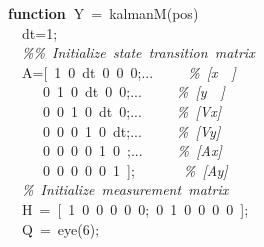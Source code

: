 \documentclass{article}\usepackage{graphicx, color}
\newcommand{\hlstd}[1]{\textcolor[rgb]{0,0,0}{#1}}%
\newcommand{\hlnum}[1]{\textcolor[rgb]{0.16,0.16,1}{#1}}
\newcommand{\hlslc}[1]{\textcolor[rgb]{0.51,0.51,0.51}{\it{#1}}}
\newcommand{\hlkwa}[1]{\textcolor[rgb]{0,0,0}{\bf{#1}}}
\newcommand{\hlopt}[1]{\textcolor[rgb]{0,0,0}{#1}}
\begin{document}
\noindent
\ttfamily
\hlstd{}\hlkwa{function\ }\hlstd{Y\ }\hlopt{=\ }\hlstd{kalmanM}\hlopt{(}\hlstd{pos}\hlopt{)}\hspace*{\fill}\\
\hlstd{}\hlstd{\ \ }\hlstd{dt}\hlopt{=}\hlstd{}\hlnum{1}\hlstd{}\hlopt{;}\hspace*{\fill}\\
\hlstd{}\hlstd{\ \ }\hlstd{}\hlslc{\%\%\ Initialize\ state\ transition\ matrix}\hspace*{\fill}\\
\hlstd{}\hlstd{\ \ }\hlstd{A}\hlopt{={[}\ }\hlstd{}\hlnum{1\ 0\ }\hlstd{dt\ }\hlnum{0\ 0\ 0}\hlstd{}\hlopt{;}\hlstd{...}\hlstd{\ \ \ \ \ }\hlstd{}\hlslc{\%\ {[}x}\hlstd{\ \ }\hlslc{{]}}\hspace*{\fill}\\
\hlstd{}\hlstd{\ \ \ \ \ }\hlstd{}\hlnum{0\ 1\ 0\ }\hlstd{dt\ }\hlnum{0\ 0}\hlstd{}\hlopt{;}\hlstd{...}\hlstd{\ \ \ \ \ }\hlstd{}\hlslc{\%\ {[}y}\hlstd{\ \ }\hlslc{{]}}\hspace*{\fill}\\
\hlstd{}\hlstd{\ \ \ \ \ }\hlstd{}\hlnum{0\ 0\ 1\ 0\ }\hlstd{dt\ }\hlnum{0}\hlstd{}\hlopt{;}\hlstd{...}\hlstd{\ \ \ \ \ }\hlstd{}\hlslc{\%\ {[}Vx{]}}\hspace*{\fill}\\
\hlstd{}\hlstd{\ \ \ \ \ }\hlstd{}\hlnum{0\ 0\ 0\ 1\ 0\ }\hlstd{dt}\hlopt{;}\hlstd{...}\hlstd{\ \ \ \ \ }\hlstd{}\hlslc{\%\ {[}Vy{]}}\hspace*{\fill}\\
\hlstd{}\hlstd{\ \ \ \ \ }\hlstd{}\hlnum{0\ 0\ 0\ 0\ 1\ 0\ }\hlstd{}\hlopt{;}\hlstd{...}\hlstd{\ \ \ \ \ }\hlstd{}\hlslc{\%\ {[}Ax{]}}\hspace*{\fill}\\
\hlstd{}\hlstd{\ \ \ \ \ }\hlstd{}\hlnum{0\ 0\ 0\ 0\ 0\ 1\ }\hlstd{}\hlopt{{]};}\hlstd{\ \ \ \ \ \ \ }\hlopt{}\hlstd{}\hlslc{\%\ {[}Ay{]}}\hspace*{\fill}\\
\hlstd{}\hlstd{\ \ }\hlstd{}\hlslc{\%\ Initialize\ measurement\ matrix}\hspace*{\fill}\\
\hlstd{}\hlstd{\ \ }\hlstd{H\ }\hlopt{=\ {[}\ }\hlstd{}\hlnum{1\ 0\ 0\ 0\ 0\ 0}\hlstd{}\hlopt{;\ }\hlstd{}\hlnum{0\ 1\ 0\ 0\ 0\ 0\ }\hlstd{}\hlopt{{]};}\hspace*{\fill}\\
\hlstd{}\hlstd{\ \ }\hlstd{Q\ }\hlopt{=\ }\hlstd{eye}\hlopt{(}\hlstd{}\hlnum{6}\hlstd{}\hlopt{);}\hspace*{\fill}\\
\end{document}
